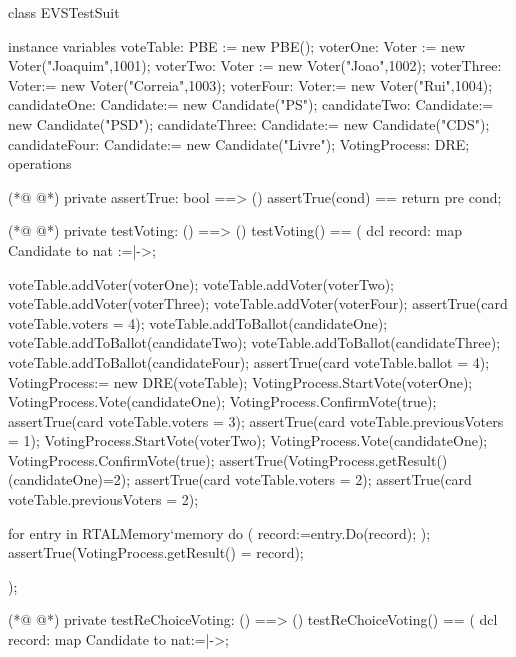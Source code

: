 \begin{vdmpp}
class EVSTestSuit

instance variables
 voteTable: PBE := new PBE();
 voterOne: Voter := new Voter("Joaquim",1001);
 voterTwo: Voter :=  new Voter("Joao",1002);
 voterThree: Voter:= new Voter("Correia",1003);
 voterFour: Voter:= new Voter("Rui",1004);
 candidateOne: Candidate:= new Candidate("PS");
 candidateTwo: Candidate:= new Candidate("PSD");
 candidateThree: Candidate:= new Candidate("CDS");
 candidateFour: Candidate:= new Candidate("Livre");
 VotingProcess: DRE;
operations

(*@
\label{assertTrue:16}
@*)
private assertTrue: bool ==> ()
 assertTrue(cond) == return
 pre cond;

(*@
\label{testVoting:20}
@*)
private testVoting: () ==> ()
testVoting() ==
(
 dcl record: map Candidate to nat :={|->};
 
 voteTable.addVoter(voterOne);
 voteTable.addVoter(voterTwo);
 voteTable.addVoter(voterThree);
 voteTable.addVoter(voterFour);
 assertTrue(card voteTable.voters = 4);
 voteTable.addToBallot(candidateOne);
 voteTable.addToBallot(candidateTwo);
 voteTable.addToBallot(candidateThree);
 voteTable.addToBallot(candidateFour);
 assertTrue(card voteTable.ballot = 4);
 VotingProcess:= new DRE(voteTable);
 VotingProcess.StartVote(voterOne);
 VotingProcess.Vote(candidateOne);
 VotingProcess.ConfirmVote(true);
 assertTrue(card voteTable.voters = 3);
 assertTrue(card voteTable.previousVoters = 1);
 VotingProcess.StartVote(voterTwo);
 VotingProcess.Vote(candidateOne);
 VotingProcess.ConfirmVote(true);
 assertTrue(VotingProcess.getResult()(candidateOne)=2);
 assertTrue(card voteTable.voters = 2);
 assertTrue(card voteTable.previousVoters = 2);
 
 for entry in RTALMemory`memory 
  do (
    record:=entry.Do(record);
  );
  assertTrue(VotingProcess.getResult() = record);
  
);

(*@
\label{testReChoiceVoting:56}
@*)
private testReChoiceVoting: () ==> ()
testReChoiceVoting() ==
( 
 dcl record: map Candidate to nat:={|->};
 

\end{vdmpp}
